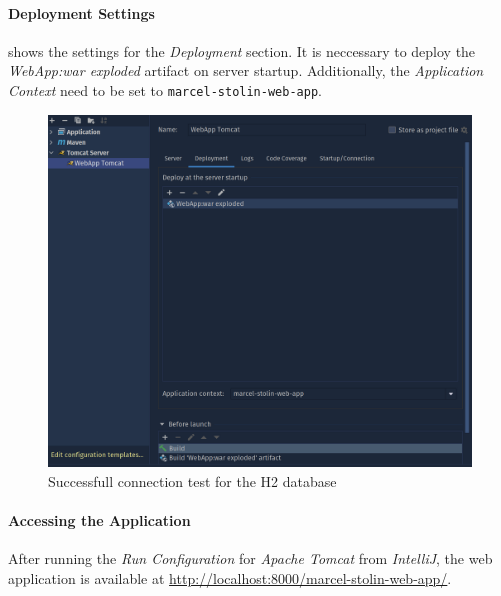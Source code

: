 \paragraph{Deployment Settings}
 shows the settings for the \textit{Deployment} section. It is neccessary to deploy the \textit{WebApp:war exploded} artifact on server startup. Additionally, the \textit{Application Context} need to be set to \texttt{marcel-stolin-web-app}.
\begin{figure}[h]
\centering
\includegraphics[scale=0.2]{images/03_depl/tomcat-config-2}
\caption{Successfull connection test for the H2 database}
\label{fig:03_depl_webapp_intellij_config2}
\end{figure}

\paragraph{Accessing the Application}
After running the \textit{Run Configuration} for \textit{Apache Tomcat} from \textit{IntelliJ}, the web application is available at \url{http://localhost:8000/marcel-stolin-web-app/}.
